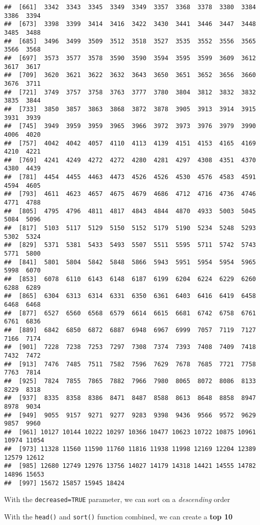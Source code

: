\documentclass[
]{article}
\begin{document}
\begin{verbatim}
##  [661]  3342  3343  3345  3349  3349  3357  3368  3378  3380  3384  3386  3394
##  [673]  3398  3399  3414  3416  3422  3430  3441  3446  3447  3448  3485  3488
##  [685]  3496  3499  3509  3512  3518  3527  3535  3552  3556  3565  3566  3568
##  [697]  3573  3577  3578  3590  3590  3594  3595  3599  3609  3612  3617  3617
##  [709]  3620  3621  3622  3632  3643  3650  3651  3652  3656  3660  3676  3711
##  [721]  3749  3757  3758  3763  3777  3780  3804  3812  3832  3832  3835  3844
##  [733]  3850  3857  3863  3868  3872  3878  3905  3913  3914  3915  3931  3939
##  [745]  3949  3959  3959  3965  3966  3972  3973  3976  3979  3990  4006  4020
##  [757]  4042  4042  4057  4110  4113  4139  4151  4153  4165  4169  4210  4221
##  [769]  4241  4249  4272  4272  4280  4281  4297  4308  4351  4370  4380  4439
##  [781]  4454  4455  4463  4473  4526  4526  4530  4576  4583  4591  4594  4605
##  [793]  4611  4623  4657  4675  4679  4686  4712  4716  4736  4746  4771  4788
##  [805]  4795  4796  4811  4817  4843  4844  4870  4933  5003  5045  5084  5096
##  [817]  5103  5117  5129  5150  5152  5179  5190  5234  5248  5293  5302  5324
##  [829]  5371  5381  5433  5493  5507  5511  5595  5711  5742  5743  5771  5800
##  [841]  5801  5804  5842  5848  5866  5943  5951  5954  5954  5965  5998  6070
##  [853]  6078  6110  6143  6148  6187  6199  6204  6224  6229  6260  6288  6289
##  [865]  6304  6313  6314  6331  6350  6361  6403  6416  6419  6458  6468  6468
##  [877]  6527  6560  6568  6579  6614  6615  6681  6742  6758  6761  6761  6836
##  [889]  6842  6850  6872  6887  6948  6967  6999  7057  7119  7127  7166  7174
##  [901]  7228  7238  7253  7297  7308  7374  7393  7408  7409  7418  7432  7472
##  [913]  7476  7485  7511  7582  7596  7629  7678  7685  7721  7758  7763  7814
##  [925]  7824  7855  7865  7882  7966  7980  8065  8072  8086  8133  8229  8318
##  [937]  8335  8358  8386  8471  8487  8588  8613  8648  8858  8947  8978  9034
##  [949]  9055  9157  9271  9277  9283  9398  9436  9566  9572  9629  9857  9960
##  [961] 10127 10144 10222 10297 10366 10477 10623 10722 10875 10961 10974 11054
##  [973] 11328 11560 11590 11760 11816 11938 11998 12169 12204 12389 12579 12612
##  [985] 12680 12749 12976 13756 14027 14179 14318 14421 14555 14782 14896 15653
##  [997] 15672 15857 15945 18424
\end{verbatim}

With the \texttt{decreased=TRUE} parameter, we can sort on a
\emph{descending} order

With the \texttt{head()} and \texttt{sort()} function combined, we can
create a \textbf{top 10}
\end{document}
